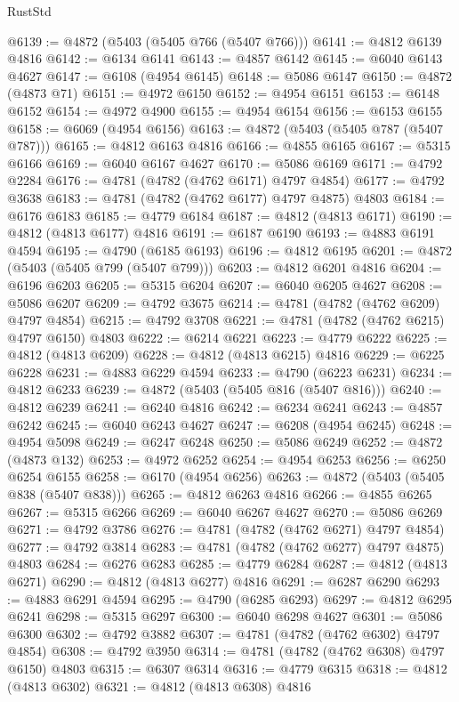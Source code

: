 \begin{lexlean}{RustStd}
\begin{coremodule}
@6139 := @4872 (@5403 (@5405 @766 (@5407 @766)))
@6141 := @4812 @6139 @4816
@6142 := @6134 @6141
@6143 := @4857 @6142
@6145 := @6040 @6143 @4627
@6147 := @6108 (@4954 @6145)
@6148 := @5086 @6147
@6150 := @4872 (@4873 @71)
@6151 := @4972 @6150
@6152 := @4954 @6151
@6153 := @6148 @6152
@6154 := @4972 @4900
@6155 := @4954 @6154
@6156 := @6153 @6155
@6158 := @6069 (@4954 @6156)
@6163 := @4872 (@5403 (@5405 @787 (@5407 @787)))
@6165 := @4812 @6163 @4816
@6166 := @4855 @6165
@6167 := @5315 @6166
@6169 := @6040 @6167 @4627
@6170 := @5086 @6169
@6171 := @4792 @2284
@6176 := @4781 (@4782 (@4762 @6171) @4797 @4854)
@6177 := @4792 @3638
@6183 := @4781 (@4782 (@4762 @6177) @4797 @4875) @4803
@6184 := @6176 @6183
@6185 := @4779 @6184
@6187 := @4812 (@4813 @6171)
@6190 := @4812 (@4813 @6177) @4816
@6191 := @6187 @6190
@6193 := @4883 @6191 @4594
@6195 := @4790 (@6185 @6193)
@6196 := @4812 @6195
@6201 := @4872 (@5403 (@5405 @799 (@5407 @799)))
@6203 := @4812 @6201 @4816
@6204 := @6196 @6203
@6205 := @5315 @6204
@6207 := @6040 @6205 @4627
@6208 := @5086 @6207
@6209 := @4792 @3675
@6214 := @4781 (@4782 (@4762 @6209) @4797 @4854)
@6215 := @4792 @3708
@6221 := @4781 (@4782 (@4762 @6215) @4797 @6150) @4803
@6222 := @6214 @6221
@6223 := @4779 @6222
@6225 := @4812 (@4813 @6209)
@6228 := @4812 (@4813 @6215) @4816
@6229 := @6225 @6228
@6231 := @4883 @6229 @4594
@6233 := @4790 (@6223 @6231)
@6234 := @4812 @6233
@6239 := @4872 (@5403 (@5405 @816 (@5407 @816)))
@6240 := @4812 @6239
@6241 := @6240 @4816
@6242 := @6234 @6241
@6243 := @4857 @6242
@6245 := @6040 @6243 @4627
@6247 := @6208 (@4954 @6245)
@6248 := @4954 @5098
@6249 := @6247 @6248
@6250 := @5086 @6249
@6252 := @4872 (@4873 @132)
@6253 := @4972 @6252
@6254 := @4954 @6253
@6256 := @6250 @6254 @6155
@6258 := @6170 (@4954 @6256)
@6263 := @4872 (@5403 (@5405 @838 (@5407 @838)))
@6265 := @4812 @6263 @4816
@6266 := @4855 @6265
@6267 := @5315 @6266
@6269 := @6040 @6267 @4627
@6270 := @5086 @6269
@6271 := @4792 @3786
@6276 := @4781 (@4782 (@4762 @6271) @4797 @4854)
@6277 := @4792 @3814
@6283 := @4781 (@4782 (@4762 @6277) @4797 @4875) @4803
@6284 := @6276 @6283
@6285 := @4779 @6284
@6287 := @4812 (@4813 @6271)
@6290 := @4812 (@4813 @6277) @4816
@6291 := @6287 @6290
@6293 := @4883 @6291 @4594
@6295 := @4790 (@6285 @6293)
@6297 := @4812 @6295 @6241
@6298 := @5315 @6297
@6300 := @6040 @6298 @4627
@6301 := @5086 @6300
@6302 := @4792 @3882
@6307 := @4781 (@4782 (@4762 @6302) @4797 @4854)
@6308 := @4792 @3950
@6314 := @4781 (@4782 (@4762 @6308) @4797 @6150) @4803
@6315 := @6307 @6314
@6316 := @4779 @6315
@6318 := @4812 (@4813 @6302)
@6321 := @4812 (@4813 @6308) @4816

\end{coremodule}
\end{lexlean}
